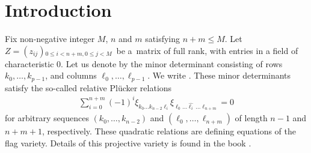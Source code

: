 \documentclass[pdftex]{sigma}
\numberwithin{equation}{section}
\begin{document}
\section{Introduction}
Fix non-negative integer $M$, $n$ and $m$ satisfying $n+m\leq M$. Let
$Z={(z_{ij})}{}_{0\leq i<n+m, 0\leq j <M}$~be a~matrix of full rank, with entries in a field of characteristic $0$. Let us denote by  the minor determinant consisting of rows $k_0,\dots,k_{p-1}$, and columns $\ell_0,\dots,\ell_{p-1}$. We write . These minor determinants satisfy the so-called relative Pl\"ucker relations
\begin{gather*}
\sum_{i=0}^{n+m}{(-1)}^{i}\xi_{k_{0}\dots k_{n-2}\ell_{i}}\xi_{\ell_{0}\dots \widehat{\ell_{i}}\,\dots \ell_{n+m}}=0
\end{gather*}
for arbitrary sequences $(k_0,\dots,k_{n-2})$ and $(\ell_0,\dots,\ell_{n+m})$ of length $n-1$ and $n+m+1$, respectively. These quadratic relations are defining equations of the flag variety. Details of this projective variety is found in the book \cite{gh}.
\end{document}
